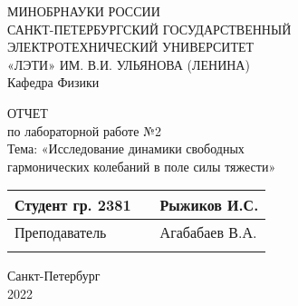 \clearpage
\begin{center}	
	МИНОБРНАУКИ РОССИИ\\
	САНКТ-ПЕТЕРБУРГСКИЙ ГОСУДАРСТВЕННЫЙ\\
	ЭЛЕКТРОТЕХНИЧЕСКИЙ УНИВЕРСИТЕТ\\
	«ЛЭТИ» ИМ. В.И. УЛЬЯНОВА (ЛЕНИНА)\\
    Кафедра Физики
	\vspace{54mm}

	ОТЧЕТ\\
	по лабораторной работе №2 \\
	Тема: «Исследование динамики свободных \\
    гармонических колебаний в поле силы тяжести»\\



	\vspace{65mm}

	\def\arraystretch{1.5}
	\begin{tabularx}{\textwidth}{ >{\hsize=7cm}X >{\hsize=4cm}X  >{\centering\arraybackslash}X }
		Студент гр. 2381 & & Рыжиков И.С. \\ \cline{2-2}
		Преподаватель & & Агабабаев В.А. \\ \cline{2-2}
	\end{tabularx}
	\def\arraystretch{1}

	\vfill
	Санкт-Петербург\\
	2022
\end{center}
\newpage
